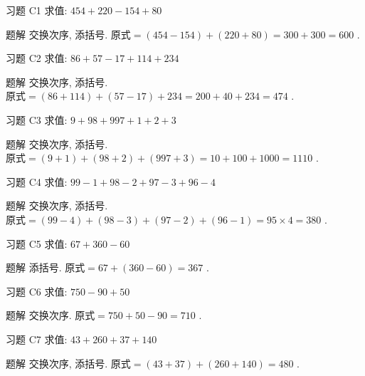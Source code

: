 \documentclass[content.tex]{subfiles}
\begin{document}
\begin{frame}{习题 C1}
求值: $454+220-154+80$
\begin{exampleblock}{题解}
交换次序, 添括号. $\text{原式} = (454-154)+(220+80) = 300+300=600$ .
\end{exampleblock}
\end{frame}

\begin{frame}{习题 C2}
求值: $86+57-17+114+234$
\begin{exampleblock}{题解}
交换次序, 添括号. \\
$\text{原式} = (86+114)+(57-17)+234 = 200+40+234=474$ .
\end{exampleblock}
\end{frame}

\begin{frame}{习题 C3}
求值: $9+98+997+1+2+3$
\begin{exampleblock}{题解}
交换次序, 添括号. \\
$\text{原式} = (9+1)+(98+2)+(997+3) = 10+100+1000=1110$ .
\end{exampleblock}
\end{frame}

\begin{frame}{习题 C4}
求值: $99-1+98-2+97-3+96-4$
\begin{exampleblock}{题解}
交换次序, 添括号. \\
$\text{原式} = (99-4)+(98-3)+(97-2)+(96-1) = 95\times 4=380$ .
\end{exampleblock}
\end{frame}

\begin{frame}{习题 C5}
求值: $67+360-60$
\begin{exampleblock}{题解}
添括号. $\text{原式} = 67+(360-60) = 367$ .
\end{exampleblock}
\end{frame}

\begin{frame}{习题 C6}
求值: $750-90+50$
\begin{exampleblock}{题解}
交换次序. $\text{原式} = 750+50-90 = 710$ .
\end{exampleblock}
\end{frame}

\begin{frame}{习题 C7}
求值: $43+260+37+140$
\begin{exampleblock}{题解}
交换次序, 添括号. $\text{原式} = (43+37) + (260+140) = 480$ .
\end{exampleblock}
\end{frame}
\end{document}
